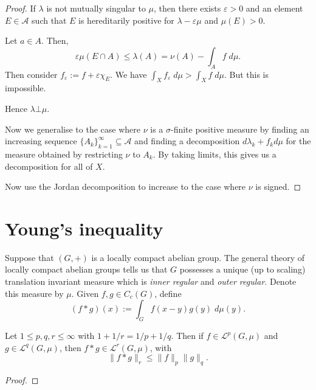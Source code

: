 \documentclass{owmaths}
\begin{document}
\begin{proof}
    If $\lambda$ is not mutually singular to $\mu$, then there exists $\varepsilon > 0$
    and an element $E \in \mathcal{A}$ such that $E$ is hereditarily positive for 
    $\lambda - \varepsilon \mu$ and $\mu(E) > 0$.
    
    Let $a \in A$. Then,
    \begin{equation*}
        \varepsilon\mu(E\cap A) \leq \lambda(A) = \nu(A) - \int_A f\;d\mu.
    \end{equation*}
    Then consider
    $f_\varepsilon := f+\varepsilon\chi_E$. We have $\int_X f_\varepsilon \;d\mu > \int_X f\;d\mu$.
    But this is impossible.
    
    Hence $\lambda \bot \mu$.
    
    Now we generalise to the case where $\nu$ is a $\sigma$-finite positive measure
    by finding an increasing sequence $\{A_k\}_{k=1}^\infty \subseteq \mathcal{A}$
    and finding a decomposition $d\lambda_k+f_kd\mu$ for the measure
    obtained by restricting $\nu$ to $A_k$. By taking limits, this
    gives us a decomposition for all of $X$.
    
    Now use the Jordan decomposition to increase to the case where $\nu$ is signed.    
\end{proof}

\section{Young's inequality}
Suppose that $(G,+)$ is a locally compact abelian group. The general
theory of locally compact abelian groups tells us that $G$ possesses
a unique (up to scaling) translation invariant measure
which is \emph{inner regular} and \emph{outer regular}. Denote
this measure by $\mu$. Given $f,g \in C_c(G)$, define
\begin{equation*}
    (f*g)(x) := \int_G f(x-y)g(y)\;d\mu(y).
\end{equation*}

\begin{proposition}
    Let $1 \leq p,q,r \leq \infty$ with $1+1/r = 1/p + 1/q$. Then if
    $f \in \mathcal{L}^p(G,\mu)$ and $g \in \mathcal{L}^q(G,\mu)$,
    then $f*g \in \mathcal{L}^r(G,\mu)$, with
    \begin{equation*}
        \|f*g\|_r \leq \|f\|_p\|g\|_q.
    \end{equation*}
\end{proposition}
\begin{proof}
    
\end{proof}
\end{document}
